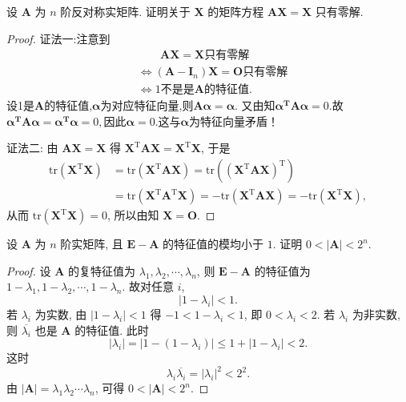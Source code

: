 \documentclass[../../main.tex]{subfiles}%
\begin{document}
\begin{example}
设 $\boldsymbol{A}$ 为 $n$ 阶反对称实矩阵. 证明关于 $\boldsymbol{X}$ 的矩阵方程 $\boldsymbol{AX} = \boldsymbol{X}$ 只有零解.
\end{example}
\begin{proof}

{\color{blue}证法一:}注意到
\begin{align*}
&\quad \quad \boldsymbol{AX}=\boldsymbol{X}\text{只有零解}
\\
&\Longleftrightarrow \left( \boldsymbol{A}-\boldsymbol{I}_n \right) \boldsymbol{X}=\boldsymbol{O}\text{只有零解}
\\
&\Longleftrightarrow 1\text{不是是}\boldsymbol{A}\text{的特征值}.
\end{align*}
设1是$\boldsymbol{A}$的特征值,$\boldsymbol{\alpha }$为对应特征向量,则$\boldsymbol{A\alpha }=\boldsymbol{\alpha }$.
又由知$\boldsymbol{\alpha }^{\boldsymbol{T}}\boldsymbol{A\alpha }=0.$故$\boldsymbol{\alpha }^{\boldsymbol{T}}\boldsymbol{A\alpha }=\boldsymbol{\alpha }^{\boldsymbol{T}}\boldsymbol{\alpha }=0,$因此$\boldsymbol{\alpha }=0.$这与$\boldsymbol{\alpha }$为特征向量矛盾！

{\color{blue}证法二:}
由 $\boldsymbol{AX} = \boldsymbol{X}$ 得 $\boldsymbol{X}^\mathrm{T}\boldsymbol{A}\boldsymbol{X} = \boldsymbol{X}^\mathrm{T}\boldsymbol{X}$, 于是
\begin{align*}
\mathrm{tr}\left( \boldsymbol{X}^\mathrm{T}\boldsymbol{X} \right) &= \mathrm{tr}\left( \boldsymbol{X}^\mathrm{T}\boldsymbol{A}\boldsymbol{X} \right) = \mathrm{tr}\left( \left( \boldsymbol{X}^\mathrm{T}\boldsymbol{A}\boldsymbol{X} \right)^\mathrm{T} \right) \\
&= \mathrm{tr}\left( \boldsymbol{X}^\mathrm{T}\boldsymbol{A}^\mathrm{T}\boldsymbol{X} \right) = -\mathrm{tr}\left( \boldsymbol{X}^\mathrm{T}\boldsymbol{A}\boldsymbol{X} \right) = -\mathrm{tr}\left( \boldsymbol{X}^\mathrm{T}\boldsymbol{X} \right),
\end{align*}
从而 $\mathrm{tr}\left( \boldsymbol{X}^\mathrm{T}\boldsymbol{X} \right) = 0$, 所以由知 $\boldsymbol{X} = \boldsymbol{O}$.
\end{proof}

\begin{example}
设 $\boldsymbol{A}$ 为 $n$ 阶实矩阵, 且 $\boldsymbol{E} - \boldsymbol{A}$ 的特征值的模均小于 $1$. 证明 $0 < |\boldsymbol{A}| < 2^n$.
\end{example}
\begin{proof}
设 $\boldsymbol{A}$ 的复特征值为 $\lambda_1, \lambda_2, \cdots, \lambda_n$, 则 $\boldsymbol{E} - \boldsymbol{A}$ 的特征值为 $1 - \lambda_1, 1 - \lambda_2, \cdots, 1 - \lambda_n$. 故对任意 $i$,
\[
|1 - \lambda_i| < 1.
\]
若 $\lambda_i$ 为实数, 由 $|1 - \lambda_i| < 1$ 得 $-1 < 1 - \lambda_i < 1$, 即 $0 < \lambda_i < 2$.
若 $\lambda_i$ 为非实数, 则 $\overline{\lambda_i}$ 也是 $\boldsymbol{A}$ 的特征值. 此时
\[
|\lambda_i| = |1 - (1 - \lambda_i)| \leqslant 1 + |1 - \lambda_i| < 2.
\]
这时
\[
\lambda_i \overline{\lambda_i} = |\lambda_i|^2 < 2^2.
\]
由 $|\boldsymbol{A}| = \lambda_1 \lambda_2 \cdots \lambda_n$, 可得 $0 < |\boldsymbol{A}| < 2^n$.
\end{proof}
\end{document}
